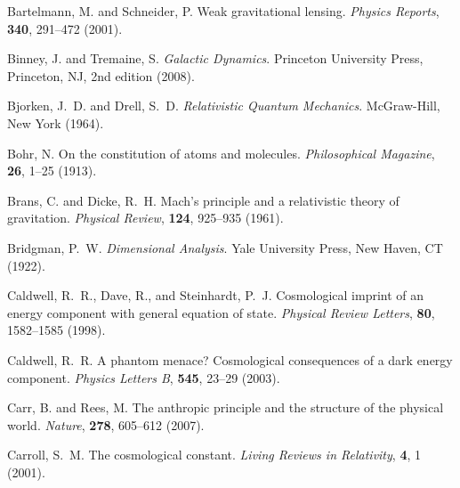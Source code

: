 \documentclass[12pt,a4paper]{article}
\begin{document}
\begin{thebibliography}{99}
		Bartelmann, M. and Schneider, P.
		\newblock Weak gravitational lensing.
		\newblock \textit{Physics Reports}, \textbf{340}, 291--472 (2001).
		\newblock {}
		
		Binney, J. and Tremaine, S.
		\newblock \textit{Galactic Dynamics}.
		\newblock Princeton University Press, Princeton, NJ, 2nd edition (2008).
		
		Bjorken, J.~D. and Drell, S.~D.
		\newblock \textit{Relativistic Quantum Mechanics}.
		\newblock McGraw-Hill, New York (1964).
		
		Bohr, N.
		\newblock On the constitution of atoms and molecules.
		\newblock \textit{Philosophical Magazine}, \textbf{26}, 1--25 (1913).
		\newblock {}
		
		Brans, C. and Dicke, R.~H.
		\newblock Mach's principle and a relativistic theory of gravitation.
		\newblock \textit{Physical Review}, \textbf{124}, 925--935 (1961).
		\newblock {}
		
		Bridgman, P.~W.
		\newblock \textit{Dimensional Analysis}.
		\newblock Yale University Press, New Haven, CT (1922).
		
		Caldwell, R.~R., Dave, R., and Steinhardt, P.~J.
		\newblock Cosmological imprint of an energy component with general equation of state.
		\newblock \textit{Physical Review Letters}, \textbf{80}, 1582--1585 (1998).
		\newblock {}
		
		Caldwell, R.~R.
		\newblock A phantom menace? Cosmological consequences of a dark energy component.
		\newblock \textit{Physics Letters B}, \textbf{545}, 23--29 (2003).
		\newblock {}
		
		Carr, B. and Rees, M.
		\newblock The anthropic principle and the structure of the physical world.
		\newblock \textit{Nature}, \textbf{278}, 605--612 (2007).
		\newblock {}
		
		Carroll, S.~M.
		\newblock The cosmological constant.
		\newblock \textit{Living Reviews in Relativity}, \textbf{4}, 1 (2001).
		\newblock {}
		

\end{thebibliography}
\end{document}
